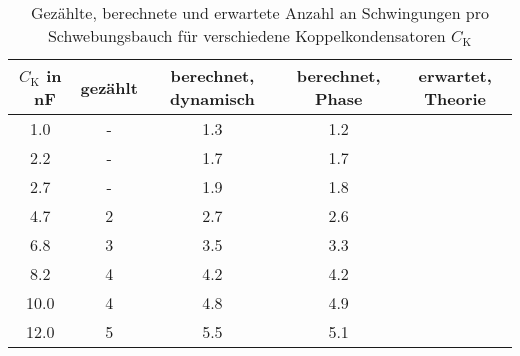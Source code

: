 \begin{table}[h!]
\begin{center}
\begin{tabular}{c | c | c | c | c}
	$C_\text{K}$ in \SI{}{\nano\farad} & gezählt & berechnet, dynamisch & berechnet, Phase & erwartet, Theorie \\
\hline
	1.0 & - & 1.3 & 1.2 &  \\
	2.2 & - & 1.7 & 1.7 &  \\
	2.7 & - & 1.9 & 1.8 &  \\
	4.7 & 2 & 2.7 & 2.6 &  \\
	6.8 & 3 & 3.5 & 3.3 &  \\
	8.2 & 4 & 4.2 & 4.2 &  \\
	10.0 & 4 & 4.8 & 4.9 &  \\
	12.0 & 5 & 5.5 & 5.1 &  \\
\end{tabular}
\end{center}
\caption{Gezählte, berechnete und erwartete Anzahl an Schwingungen pro Schwebungsbauch für verschiedene Koppelkondensatoren $C_\text{K}$}
\label{fig:Bauch}
\end{table}